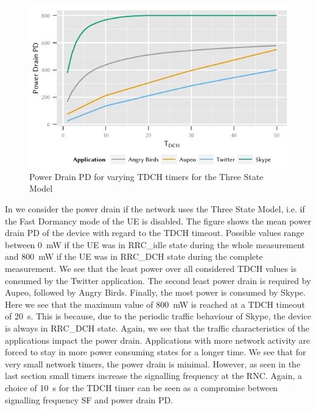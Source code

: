 \begin{figure}
	\centering
	\includegraphics{network/network_traces/numerical_results/figures/3_state_tdch_vs_power_drain}
	\caption{Power Drain \gls{PD} for varying \gls{TDCH} timers for the Three State Model}\label{fig:network:network_traces:numerical_results:three_states:power_drain}
\end{figure}
In  we consider the power drain if the network uses the Three State Model, i.e. if the Fast Dormancy mode of the \gls{UE} is disabled.
The figure shows the mean power drain \gls{PD} of the device with regard to the \gls{TDCH} timeout.
Possible values range between \SI{0}{\milli\watt} if the \gls{UE} was in \gls{RRC_idle} state during the whole measurement and \SI{800}{\milli\watt} if the \gls{UE} was in \gls{RRC_DCH} state during the complete measurement.
We see that the least power over all considered \gls{TDCH} values is consumed by the Twitter application.
The second least power drain is required by Aupeo, followed by Angry Birds.
Finally, the most power is consumed by Skype.
Here we see that the maximum value of \SI{800}{\milli\watt} is reached at a \gls{TDCH} timeout of \SI{20}{\second}.
This is because, due to the periodic traffic behaviour of Skype, the device is always in \gls{RRC_DCH} state.
Again, we see that the traffic characteristics of the applications impact the power drain.
Applications with more network activity are forced to stay in more power consuming states for a longer time.
We see that for very small network timers, the power drain is minimal.
However, as seen in the last section small timers increase the signalling frequency at the \gls{RNC}.
Again, a choice of \SI{10}{\second} for the \gls{TDCH} timer can be seen as a compromise between signalling frequency \gls{SF} and power drain \gls{PD}.

